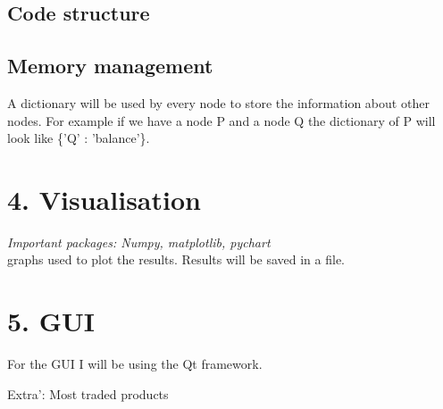 \documentclass{article}
\begin{document}
\subsection{Code structure}


\subsection{Memory management}
A dictionary will be used by every node to store the information about other nodes. For example if we have a node P and a node Q the dictionary of P will look like \{'Q' : 'balance'\}.
\section{4. Visualisation}
\textit{Important packages: Numpy, matplotlib, pychart}
\\
graphs used to plot the results. Results will be saved in a file.
\section{5. GUI}
For the GUI I will be using the Qt framework.

Extra':
Most traded products




\end{document}
